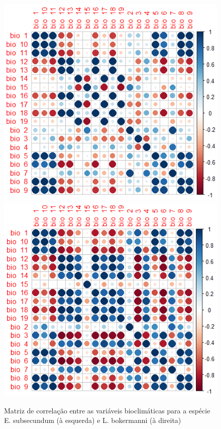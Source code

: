 \documentclass[
  11pt,
]{article}
\begin{document}
\begin{figure}

{\centering \includegraphics[width=0.49\linewidth]{../Dados/Resultados_VIF/E_subsecundum/Corr_plot_19_biovars} \includegraphics[width=0.49\linewidth]{../Dados/Resultados_VIF/L_bokermanni/Corr_plot_19_biovars} 

}

\caption{Matriz de correlação entre as variáveis bioclimáticas para a espécie E. subsecundum (à esquerda) e L. bokermanni (à direita)}\label{fig:VIF_subs}
\end{figure}
\end{document}
